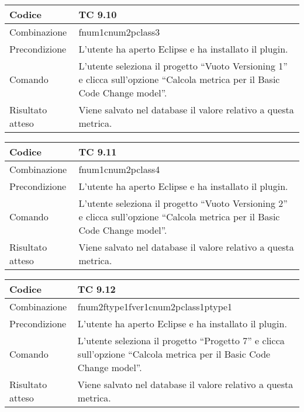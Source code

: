\begin{table}[ht]
\begin{tabular}{|p{3cm}|p{9cm}|}
\hline
\cellcolor{lightgray}Codice				& TC 9.10								\\
\hline
\cellcolor{lightgray}Combinazione		& fnum1cnum2pclass3									\\
\hline
\cellcolor{lightgray}Precondizione		& L'utente ha aperto Eclipse e ha installato il plugin.		\\
\hline
\cellcolor{lightgray}Comando			& L'utente seleziona il progetto ``Vuoto Versioning 1''  e clicca sull'opzione ``Calcola metrica per il Basic Code Change model''.	\\
\hline
\cellcolor{lightgray}Risultato atteso	& Viene salvato nel database il valore relativo a questa metrica.\\
\hline
\end{tabular}
\end{table}

\begin{table}[ht]
\begin{tabular}{|p{3cm}|p{9cm}|}
\hline
\cellcolor{lightgray}Codice				& TC 9.11								\\
\hline
\cellcolor{lightgray}Combinazione		& fnum1cnum2pclass4									\\
\hline
\cellcolor{lightgray}Precondizione		& L'utente ha aperto Eclipse e ha installato il plugin.		\\
\hline
\cellcolor{lightgray}Comando			& L'utente seleziona il progetto ``Vuoto Versioning 2''  e clicca sull'opzione ``Calcola metrica per il Basic Code Change model''.	\\
\hline
\cellcolor{lightgray}Risultato atteso	& Viene salvato nel database il valore relativo a questa metrica.\\
\hline
\end{tabular}
\end{table}

\begin{table}[ht]
\begin{tabular}{|p{3cm}|p{9cm}|}
\hline
\cellcolor{lightgray}Codice				& TC 9.12								\\
\hline
\cellcolor{lightgray}Combinazione		& fnum2ftype1fver1cnum2pclass1ptype1									\\
\hline
\cellcolor{lightgray}Precondizione		& L'utente ha aperto Eclipse e ha installato il plugin.		\\
\hline
\cellcolor{lightgray}Comando			& L'utente seleziona il progetto ``Progetto 7''  e clicca sull'opzione ``Calcola metrica per il Basic Code Change model''.	\\
\hline
\cellcolor{lightgray}Risultato atteso	& Viene salvato nel database il valore relativo a questa metrica.\\
\hline
\end{tabular}
\end{table}


